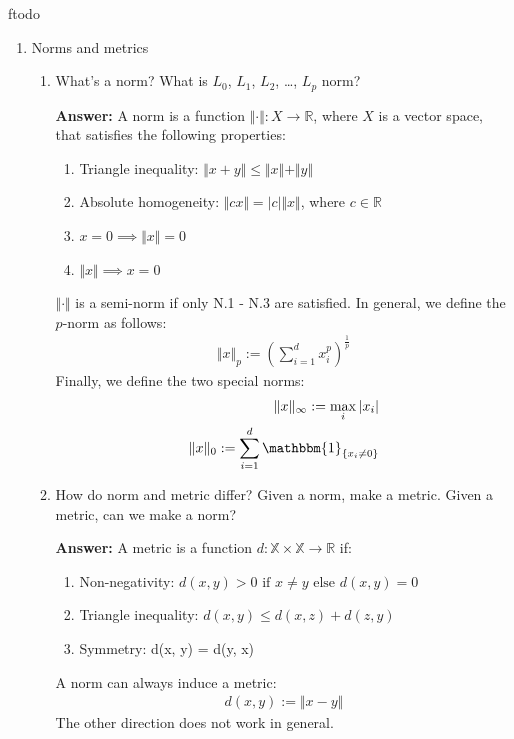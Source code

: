 ƒtodo\documentclass{article}
\newenvironment{QandA}{\begin{enumerate}[label=\arabic*.]}{\end{enumerate}}
\newenvironment{InnerQandA}{\begin{enumerate}[label=\roman*.]}{\end{enumerate}}
\newenvironment{answer}{\par\normalfont \textbf{Answer:}}{}
\newcommand{\R}{\mathbb{R}}
\begin{document}
\begin{QandA}
    \item Norms and metrics
    \begin{InnerQandA}
        \item What's a norm? What is $L_0$, $L_1$, $L_2$, \ldots, $L_p$ norm?
        \begin{answer}
            A norm is a function $\Vert \cdot \Vert: X \rightarrow \R$, where $X$ is a vector space, that satisfies the following properties:
            \begin{enumerate}[label={N.\arabic*.}]
                \item Triangle inequality: $\Vert x + y \Vert \le \Vert x \Vert + \Vert y \Vert$
                \item Absolute homogeneity: $\Vert cx \Vert = \vert c \vert \Vert x \Vert $, where $c \in \R$
                \item $x = 0 \implies \Vert x \Vert = 0 $ 
                \item $\Vert x \Vert \implies x = 0$
            \end{enumerate}
            $\Vert \cdot \Vert$ is a semi-norm if only N.1 - N.3 are satisfied. In general, we define the $p$-norm as follows:
            \begin{align*}
                \Vert x \Vert_p := \left( \sum_{i=1}^d x_i^p \right)^{\frac{1}{p}}
            \end{align*}
            Finally, we define the two special norms:
            \begin{align*}
                \Vert x \Vert_\infty := \max_{i} \vert x_i \vert \\
                \Vert x \Vert_0 := \sum_{i=1}^d \mathbbm{1}_{\{ x_i \neq 0 \}}
            \end{align*}
        \end{answer}

        \item How do norm and metric differ? Given a norm, make a metric. Given a metric, can we make a norm?
        \begin{answer}
            A metric is a function $d: \mathbb{X} \times \mathbb{X} \rightarrow \R$ if: 
            \begin{enumerate}[label={M.\arabic*.}]
                \item Non-negativity: $d(x, y) > 0 \text{ if } x \neq y \text{ else } d(x,y) = 0$ 
                \item Triangle inequality: $d(x, y) \le d(x, z) + d(z, y)$
                \item Symmetry: d(x, y) = d(y, x)
            \end{enumerate}
            A norm can always induce a metric: 
            \begin{align*}
                d(x, y) := \Vert x - y \Vert 
            \end{align*}
            The other direction does not work in general.
        \end{answer}
    \end{InnerQandA}
    
\end{QandA}
\end{document}
